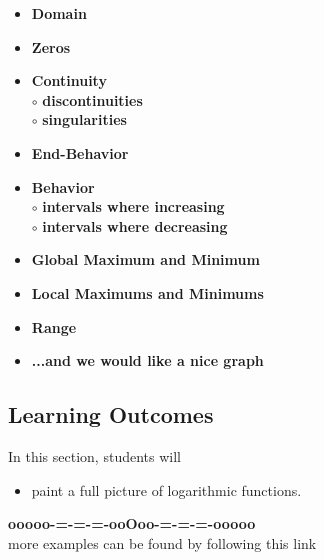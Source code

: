 \documentclass{ximera}
\begin{document}
\begin{itemize}
     \item \textbf{\textcolor{red!70!black}{Domain}} 
     \item \textbf{\textcolor{red!70!black}{Zeros}} 
     \item \textbf{\textcolor{red!70!black}{Continuity}} \\
     \text{    }$\circ$ \textbf{\textcolor{purple!85!blue}{discontinuities}}\\
     \text{    }$\circ$ \textbf{\textcolor{purple!85!blue}{singularities}}\\
     \item \textbf{\textcolor{red!70!black}{End-Behavior}} 
     \item \textbf{\textcolor{red!70!black}{Behavior}} \\
     \text{    }$\circ$ \textbf{\textcolor{purple!85!blue}{intervals where increasing}}\\
     \text{    }$\circ$ \textbf{\textcolor{purple!85!blue}{intervals where decreasing}}\\
     \item \textbf{\textcolor{red!70!black}{Global Maximum and Minimum}} 
     \item \textbf{\textcolor{red!70!black}{Local Maximums and Minimums}} 
     \item \textbf{\textcolor{red!70!black}{Range}} 
     \item \textbf{\textcolor{blue!55!black}{...and we would like a nice graph}} 
\end{itemize}




\subsection*{Learning Outcomes}


\begin{sectionOutcomes}
In this section, students will 

\begin{itemize}
\item paint a full picture of logarithmic functions.
\end{itemize}
\end{sectionOutcomes}












\begin{center}
\textbf{\textcolor{green!50!black}{ooooo-=-=-=-ooOoo-=-=-=-ooooo}} \\

more examples can be found by following this link\\ 

\end{center}
\end{document}
